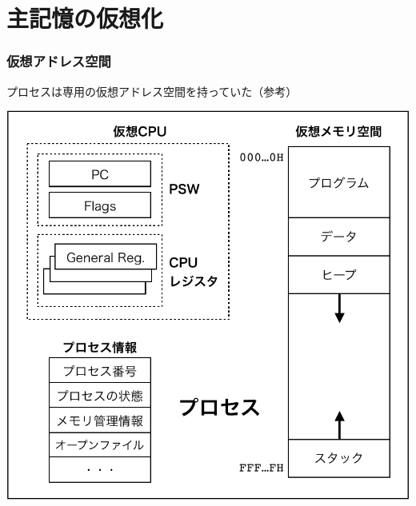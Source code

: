 \documentclass{beamer}                   %
\begin{document}
\section{主記憶の仮想化}
\begin{frame}
  \frametitle{仮想アドレス空間}
  プロセスは専用の仮想アドレス空間を持っていた（参考）
  \begin{center}
    \includegraphics[scale=0.45]{Fig/procOrganization-crop.pdf}
  \end{center}
\end{frame}
\end{document}
